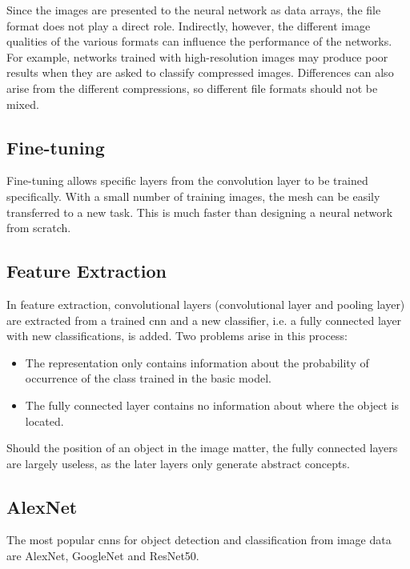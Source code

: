 Since the images are presented to the neural network as data arrays, the file format does not play a direct role. Indirectly, however, the different image qualities of the various formats can influence the performance of the networks. For example, networks trained with high-resolution images may produce poor results when they are asked to classify compressed images. \cite{Dodge:2016} Differences can also arise from the different compressions, so different file formats should not be mixed.

\subsection{Fine-tuning}

Fine-tuning allows specific layers from the convolution layer to be trained specifically. With a small number of training images, the mesh can be easily transferred to a new task. This is much faster than designing a neural network from scratch. \cite{Chollet:2018}		

\subsection{Feature Extraction}

In feature extraction, convolutional layers (convolutional layer and pooling layer) are extracted from a trained \ac{cnn} and a new classifier, i.e. a fully connected layer with new classifications, is added. Two problems arise in this process:

\begin{itemize}
    \item The representation only contains information about the probability of occurrence of the class trained in the basic model.
    \item The fully connected layer contains no information about where the object is located.
\end{itemize}
	
Should the position of an object in the image matter, the fully connected layers are largely useless, as the later layers only generate abstract concepts. \cite{Chollet:2018}

\subsection{AlexNet}
The most popular \ac{cnn}s for object detection and classification from image data are AlexNet, GoogleNet and ResNet50. \cite{Sharma:2018}

